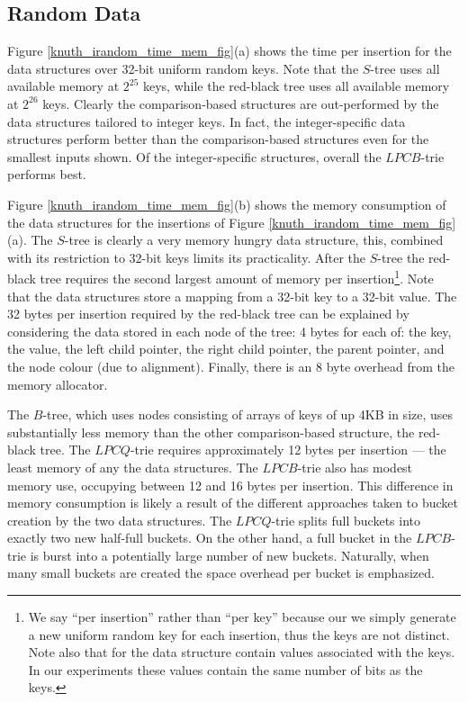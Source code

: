 \documentclass[]{acmtrans2m}
\begin{document}
\subsection{Random Data}
\label{random_results}

Figure \ref{knuth_irandom_time_mem_fig}(a) shows the time per insertion for
the data structures over 32-bit uniform random keys. Note that the $S$-tree uses all available memory at
$2^{25}$ keys, while the red-black tree uses all available memory at $2^{26}$ keys.
Clearly the comparison-based structures are out-performed by the data structures tailored to integer keys.
In fact, the integer-specific data structures perform better than the comparison-based structures even for
the smallest inputs shown. Of the integer-specific structures, overall the $LPCB$-trie performs best. 

Figure \ref{knuth_irandom_time_mem_fig}(b) shows the memory consumption of the data structures for the insertions
of Figure \ref{knuth_irandom_time_mem_fig}(a). The $S$-tree is clearly a very memory hungry data structure, this,
combined with its restriction to 32-bit keys limits its practicality. After the $S$-tree the red-black tree requires the
second largest amount of memory per insertion\footnote{We say ``per insertion'' rather than ``per key'' because our we simply generate
a new uniform random key for each insertion, thus the keys are not distinct. Note also that for the data structure contain values associated with the keys.
In our experiments these values contain the same number of bits as the keys.}. Note that the data structures store a mapping
from a 32-bit key to a 32-bit value. The 32 bytes per insertion required by the red-black tree can be explained by considering the data
stored in each node of the tree: 4 bytes for each of: the key, the value, the left child pointer, the right child pointer, the parent pointer, 
and the node colour (due to alignment). Finally, there is an 8 byte overhead from the memory allocator.

The $B$-tree, which uses nodes consisting of arrays of keys of up 4KB in size, uses substantially less memory than the other comparison-based structure,
the red-black tree. The $LPCQ$-trie requires approximately 12 bytes per insertion --- the least memory of any the data structures. 
The $LPCB$-trie also has modest memory use, occupying between 12 and 16 bytes per insertion. This difference in memory consumption is likely a result
of the different approaches taken to bucket creation by the two data structures. The $LPCQ$-trie splits full buckets into exactly two new half-full buckets.
On the other hand, a full bucket in the $LPCB$-trie is burst into a potentially large number of new buckets. Naturally, when many small buckets are created the
space overhead per bucket is emphasized.
\end{document}
